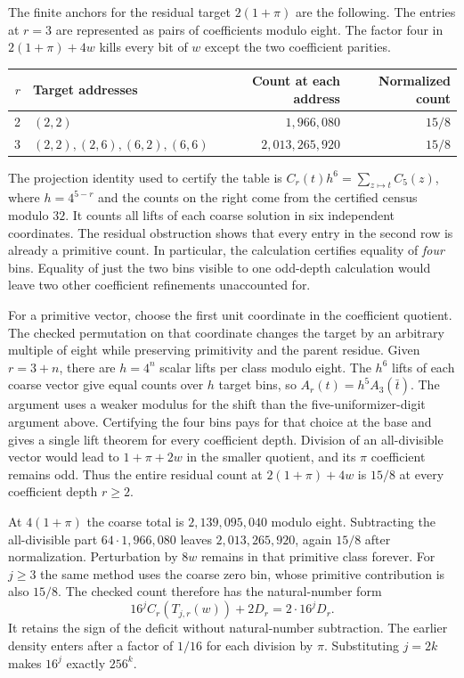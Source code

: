 \documentclass[12pt,letterpaper]{article}
\begin{document}
The finite anchors for the residual target $2(1+\pi)$ are the following. The entries at $r=3$ are represented as pairs of coefficients modulo eight. The factor four in $2(1+\pi)+4w$ kills every bit of $w$ except the two coefficient parities.

\begin{center}
\begin{tabular}{@{}r l r r@{}}
\toprule
$r$ & Target addresses & Count at each address & Normalized count \\
\midrule
2 & $(2,2)$ & $1{,}966{,}080$ & $15/8$ \\
3 & $(2,2),(2,6),(6,2),(6,6)$ & $2{,}013{,}265{,}920$ & $15/8$ \\
\bottomrule
\end{tabular}
\end{center}

The projection identity used to certify the table is $C_r(t)h^6=\sum_{z\mapsto t}C_5(z)$, where $h=4^{5-r}$ and the counts on the right come from the certified census modulo $32$. It counts all lifts of each coarse solution in six independent coordinates. The residual obstruction shows that every entry in the second row is already a primitive count. In particular, the calculation certifies equality of \emph{four} bins. Equality of just the two bins visible to one odd-depth calculation would leave two other coefficient refinements unaccounted for.

For a primitive vector, choose the first unit coordinate in the coefficient quotient. The checked permutation on that coordinate changes the target by an arbitrary multiple of eight while preserving primitivity and the parent residue. Given $r=3+n$, there are $h=4^n$ scalar lifts per class modulo eight. The $h^6$ lifts of each coarse vector give equal counts over $h$ target bins, so $A_r(t)=h^5 A_3(\bar t)$. The argument uses a weaker modulus for the shift than the five-uniformizer-digit argument above. Certifying the four bins pays for that choice at the base and gives a single lift theorem for every coefficient depth. Division of an all-divisible vector would lead to $1+\pi+2w$ in the smaller quotient, and its $\pi$ coefficient remains odd. Thus the entire residual count at $2(1+\pi)+4w$ is $15/8$ at every coefficient depth $r\geq2$.

At $4(1+\pi)$ the coarse total is $2{,}139{,}095{,}040$ modulo eight. Subtracting the all-divisible part $64\cdot1{,}966{,}080$ leaves $2{,}013{,}265{,}920$, again $15/8$ after normalization. Perturbation by $8w$ remains in that primitive class forever. For $j\geq3$ the same method uses the coarse zero bin, whose primitive contribution is also $15/8$. The checked count therefore has the natural-number form
\[
 16^j C_r(T_{j,r}(w))+2D_r=2\cdot16^j D_r .
\]
It retains the sign of the deficit without natural-number subtraction. The earlier density enters after a factor of $1/16$ for each division by $\pi$. Substituting $j=2k$ makes $16^j$ exactly $256^k$.
\end{document}
